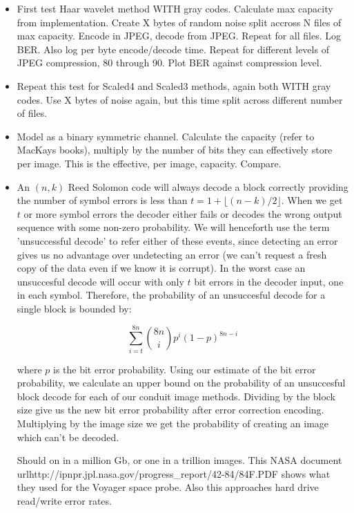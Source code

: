 \begin{itemize}
\item First test Haar wavelet method WITH gray codes. Calculate max capacity from implementation. Create X bytes of random noise split accross N files of max capacity. Encode in JPEG, decode from JPEG. Repeat for all files. Log BER. Also log per byte encode/decode time. Repeat for different levels of JPEG compression, 80 through 90. Plot BER against compression level.

\item Repeat this test for Scaled4 and Scaled3 methods, again both WITH gray codes. Use X bytes of noise again, but this time split across different number of files.

\item Model as a binary symmetric channel. Calculate the capacity (refer to MacKays books), multiply by the number of bits they can effectively store per image. This is the effective, per image, capacity. Compare.

\item An $(n,k)$ Reed Solomon code will always decode a block correctly providing the number of symbol errors is less than $t = 1 + \lfloor (n-k)/2  \rfloor$. When we get $t$ or more symbol errors the decoder either fails or decodes the wrong output sequence with some non-zero probability. We will henceforth use the term 'unsuccessful decode' to refer either of these events, since detecting an error gives us no advantage over undetecting an error (we can't request a fresh copy of the data even if we know it is corrupt). In the worst case an unsuccesful decode will occur with only $t$ bit errors in the decoder input, one in each symbol. Therefore, the probability of an unsuccesful decode for a single block is bounded by:

\begin{equation}
    \sum_{i=t}^{8n} {{8n}\choose{i}} p^i (1-p)^{8n-i}
\end{equation}

where $p$ is the bit error probability. Using our estimate of the bit error probability, we calculate an upper bound on the probability of an unsuccesful block decode for each of our conduit image methods. Dividing by the block size give us the new bit error probability after error correction encoding. Multiplying by the image size we get the probability of creating an image which can't be decoded.

Should on in a million Gb, or one in a trillion images. This NASA document url{http://ipnpr.jpl.nasa.gov/progress\_report/42-84/84F.PDF} shows what they used for the Voyager space probe. Also this approaches hard drive read/write error rates.


\end{itemize}
